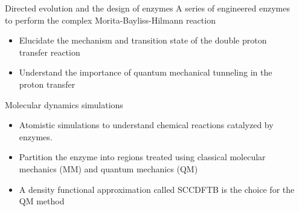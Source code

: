 \documentclass[final]{beamer}
\newlength{\sepwidth}
\newlength{\colwidth}
\newcommand{\separatorcolumn}{\begin{column}{\sepwidth}\end{column}}
\begin{document}
\begin{frame}[t]
\begin{columns}[t]
\separatorcolumn

\begin{column}{\colwidth}

\begin{block}{Directed evolution and the design of enzymes}
A series of engineered enzymes to perform the complex Morita-Bayliss-Hilmann reaction \cite{Crawshaw22NatChem14p313} 
    \begin{itemize}
      \item Elucidate the mechanism and transition state of the double proton transfer reaction 
      \item Understand the importance of quantum mechanical tunneling in the proton transfer
    \end{itemize}
 
  \end{block}

\begin{block}{Molecular dynamics simulations}
\begin{itemize}
\item Atomistic simulations to understand chemical reactions catalyzed by enzymes.
\item Partition the enzyme into regions treated using classical molecular mechanics (MM)
and quantum mechanics (QM)
\item A density functional approximation called SCCDFTB is the choice for the QM method
\end{itemize}


\end{block}
\end{column}
\end{columns}
\end{frame}
\end{document}
